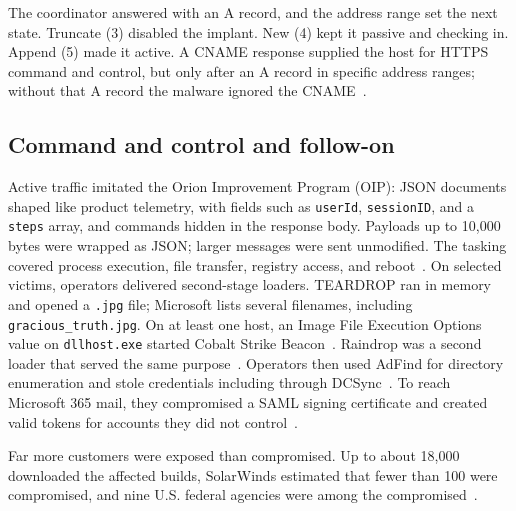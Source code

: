 The coordinator answered with an A record, and the address range set the next state. Truncate (3) disabled the implant. New (4) kept it passive and checking in. Append (5) made it active. A CNAME response supplied the host for HTTPS command and control, but only after an A record in specific address ranges; without that A record the malware ignored the CNAME~\cite{mandiant-sunburst-details}.

\subsection{Command and control and follow-on}

Active traffic imitated the Orion Improvement Program (OIP): JSON documents shaped like product telemetry, with fields such as \texttt{userId}, \texttt{sessionID}, and a \texttt{steps} array, and commands hidden in the response body. Payloads up to 10,000 bytes were wrapped as JSON; larger messages were sent unmodified. The tasking covered process execution, file transfer, registry access, and reboot~\cite{mandiant-sunburst-details}. On selected victims, operators delivered second-stage loaders. TEARDROP ran in memory and opened a \texttt{.jpg} file; Microsoft lists several filenames, including \texttt{gracious\_truth.jpg}. On at least one host, an Image File Execution Options value on \texttt{dllhost.exe} started Cobalt Strike Beacon~\cite{microsoft-teardrop}. Raindrop was a second loader that served the same purpose~\cite{microsoft-teardrop}. Operators then used AdFind for directory enumeration and stole credentials including through DCSync~\cite{cisa-aa20-352a}. To reach Microsoft 365 mail, they compromised a SAML signing certificate and created valid tokens for accounts they did not control~\cite{cisa-aa20-352a}.

Far more customers were exposed than compromised. Up to about 18,000 downloaded the affected builds, SolarWinds estimated that fewer than 100 were compromised, and nine U.S. federal agencies were among the compromised~\cite{gao}.
